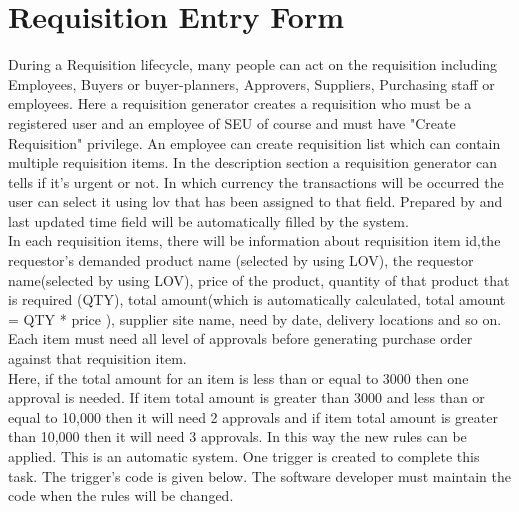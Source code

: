 \documentclass[12pt]{report} %
\begin{document}
\section{Requisition Entry Form}
During a Requisition lifecycle, many people can act on the requisition including Employees, Buyers or buyer-planners, Approvers, Suppliers, Purchasing staff or employees. Here a requisition generator creates a requisition who must be a registered user and an employee of SEU of course and must have "Create Requisition" privilege. An employee can create requisition list which can contain multiple requisition items. In the description section a requisition generator can tells if it's urgent or not. In which currency the transactions will be occurred the user can select it using lov that has been assigned to that field. Prepared by and last updated time field will be automatically filled by the system.\\

In each requisition items, there will be information about requisition item id,the requestor's demanded product name (selected by using LOV), the requestor name(selected by using LOV), price of the product, quantity of that product that is required (QTY), total amount(which is automatically calculated, total amount = QTY * price ), supplier site name, need by date, delivery locations and so on. Each item must need all level of approvals before generating purchase order against that requisition item.\\

Here, if the total amount for an item is less than or equal to 3000 then one approval is needed. If item total amount is greater than 3000 and less than or equal to 10,000 then it will need 2 approvals  and if item total amount is greater than 10,000 then it will need 3 approvals. In this way the new rules can be applied. This is an automatic system. One trigger is created to complete this task. The trigger's code is given below. The software developer must maintain the code when the rules will be changed.\\%
\end{document}
